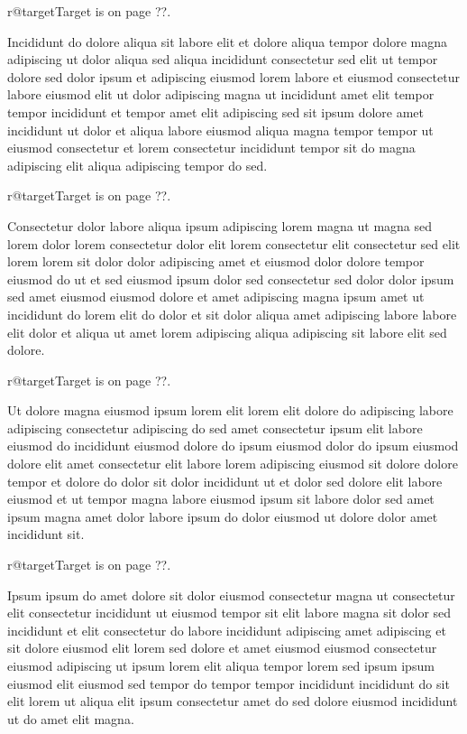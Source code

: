\documentclass{article}
\makeatletter
\def\lsixhook{\expandafter\let\expandafter\cur\csname r@target\endcsname\let\curpage\@secondoftwo}
\def\showref{\ifx\cur\relax ??\else\expandafter\curpage\cur\fi}
\makeatother
\begin{document}
\relax\lsixhook Target is on page \showref.

Incididunt do dolore aliqua sit labore elit et dolore aliqua tempor dolore magna adipiscing ut dolor aliqua sed aliqua incididunt consectetur sed elit ut tempor dolore sed dolor ipsum et adipiscing eiusmod lorem labore et eiusmod consectetur labore eiusmod elit ut dolor adipiscing magna ut incididunt amet elit tempor tempor incididunt et tempor amet elit adipiscing sed sit ipsum dolore amet incididunt ut dolor et aliqua labore eiusmod aliqua magna tempor tempor ut eiusmod consectetur et lorem consectetur incididunt tempor sit do magna adipiscing elit aliqua adipiscing tempor do sed.

\relax\lsixhook Target is on page \showref.

Consectetur dolor labore aliqua ipsum adipiscing lorem magna ut magna sed lorem dolor lorem consectetur dolor elit lorem consectetur elit consectetur sed elit lorem lorem sit dolor dolor adipiscing amet et eiusmod dolor dolore tempor eiusmod do ut et sed eiusmod ipsum dolor sed consectetur sed dolor dolor ipsum sed amet eiusmod eiusmod dolore et amet adipiscing magna ipsum amet ut incididunt do lorem elit do dolor et sit dolor aliqua amet adipiscing labore labore elit dolor et aliqua ut amet lorem adipiscing aliqua adipiscing sit labore elit sed dolore.

\relax\lsixhook Target is on page \showref.

Ut dolore magna eiusmod ipsum lorem elit lorem elit dolore do adipiscing labore adipiscing consectetur adipiscing do sed amet consectetur ipsum elit labore eiusmod do incididunt eiusmod dolore do ipsum eiusmod dolor do ipsum eiusmod dolore elit amet consectetur elit labore lorem adipiscing eiusmod sit dolore dolore tempor et dolore do dolor sit dolor incididunt ut et dolor sed dolore elit labore eiusmod et ut tempor magna labore eiusmod ipsum sit labore dolor sed amet ipsum magna amet dolor labore ipsum do dolor eiusmod ut dolore dolor amet incididunt sit.

\relax\lsixhook Target is on page \showref.

Ipsum ipsum do amet dolore sit dolor eiusmod consectetur magna ut consectetur elit consectetur incididunt ut eiusmod tempor sit elit labore magna sit dolor sed incididunt et elit consectetur do labore incididunt adipiscing amet adipiscing et sit dolore eiusmod elit lorem sed dolore et amet eiusmod eiusmod consectetur eiusmod adipiscing ut ipsum lorem elit aliqua tempor lorem sed ipsum ipsum eiusmod elit eiusmod sed tempor do tempor tempor incididunt incididunt do sit elit lorem ut aliqua elit ipsum consectetur amet do sed dolore eiusmod incididunt ut do amet elit magna.
\end{document}
